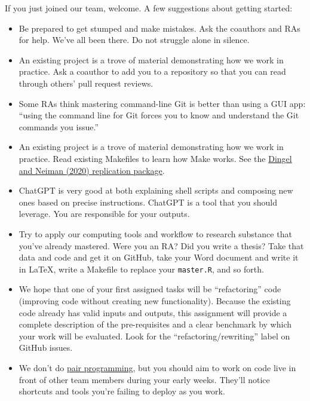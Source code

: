 If you just joined our team, welcome.
A few suggestions about getting started:
\begin{itemize}
\item
Be prepared to get stumped and make mistakes.
Ask the coauthors and RAs for help.
We've all been there.
Do not struggle alone in silence.
\item
An existing project is a trove of material demonstrating how we work in practice.
Ask a coauthor to add you to a repository so that you can read through others' pull request reviews.
\item
Some RAs think mastering command-line Git is better than using a GUI app:
``using the command line for Git forces you to know and understand the Git commands you issue.''
\item
An existing project is a trove of material demonstrating how we work in practice.
Read existing Makefiles to learn how Make works.
See the \href{https://github.com/jdingel/DingelNeiman-workathome}{Dingel and Neiman (2020) replication package}.
\item
ChatGPT is very good at both explaining shell scripts and composing new ones based on precise instructions.
ChatGPT is a tool that you should leverage.
You are responsible for your outputs.
\item
Try to apply our computing tools and workflow to research substance that you've already mastered.
Were you an RA? Did you write a thesis? 
Take that data and code and get it on GitHub, take your Word document and write it in \LaTeX, write a Makefile to replace your \texttt{master.R}, and so forth.
\item
We hope that one of your first assigned tasks will be ``refactoring'' code (improving code without creating new functionality).
Because the existing code already has valid inputs and outputs,
this assignment will provide a complete description of the pre-requisites and a clear benchmark by which your work will be evaluated.
Look for the ``refactoring/rewriting'' label on GitHub issues.
\item
We don't do \href{https://en.wikipedia.org/wiki/Pair_programming}{pair programming},
but you should aim to work on code live in front of other team members during your early weeks.
They'll notice shortcuts and tools you're failing to deploy as you work.
\end{itemize}
